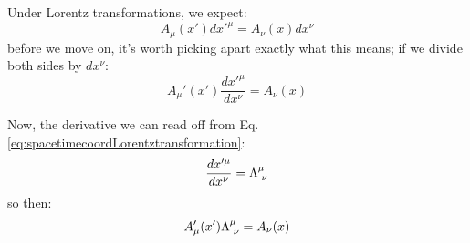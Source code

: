 Under Lorentz transformations, we expect:
\begin{equation}
    A_\mu(x')dx'^\mu = A_\nu(x)dx^\nu
\end{equation}
before we move on, it's worth picking apart exactly what this means; if we divide both sides by $dx^\nu$:
\begin{equation}
    A_\mu'(x')\frac{dx'^\mu}{dx^\nu} = A_\nu(x)
\end{equation}

Now, the derivative we can read off from Eq. \eqref{eq:spacetimecoordLorentztransformation}:
\begin{equation}
    \frac{dx'^\mu}{dx^\nu} = \Lambda^{\mu}_{\sp\nu}
\end{equation}
so then:
\begin{equation}
    A_\mu'(x')\Lambda^{\mu}_{\sp\nu}= A_\nu(x)
\end{equation}

